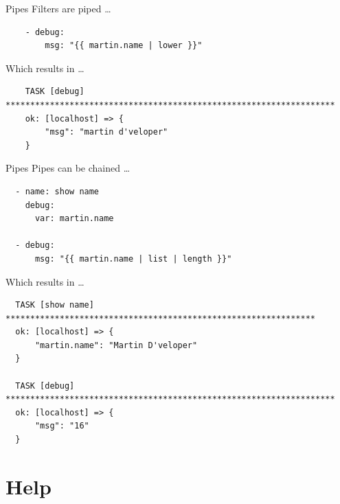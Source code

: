\documentclass[pdf]{beamer}
\begin{document}
\begin{frame}[t,fragile]{Pipes}
  Filters are piped \ldots
  \pause
  \begin{verbatim}
    - debug:
        msg: "{{ martin.name | lower }}"
  \end{verbatim}
  \pause
  Which results in \ldots
  \begin{verbatim}
    TASK [debug] *******************************************************************
    ok: [localhost] => {
        "msg": "martin d'veloper"
    }
  \end{verbatim}
\end{frame}

\begin{frame}[t,fragile]{Pipes}
  Pipes can be chained \ldots
  \pause
  \begin{verbatim}
  - name: show name
    debug:
      var: martin.name

  - debug:
      msg: "{{ martin.name | list | length }}"
  \end{verbatim}
  \pause
  Which results in \ldots
  \begin{verbatim}
  TASK [show name] ***************************************************************
  ok: [localhost] => {
      "martin.name": "Martin D'veloper"
  }

  TASK [debug] *******************************************************************
  ok: [localhost] => {
      "msg": "16"
  }
  \end{verbatim}
\end{frame}

\section{Help}

\end{document}
